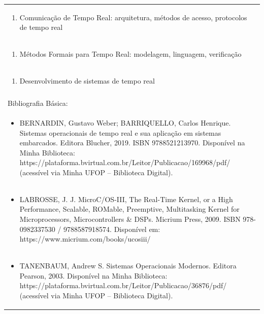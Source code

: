 \documentclass[11pt]{article}
\begin{document}
\begin{center}
\begin{longtable}{|p{4cm}|p{4cm}|p{4cm}|p{4cm}|}
\multicolumn{4}{|p{\dimexpr 16cm + 6\tabcolsep\relax}|}{\begin{enumerate}[start=8]\item Comunicação de Tempo Real: arquitetura, métodos de acesso, protocolos de tempo real\end{enumerate}}\\
\multicolumn{4}{|p{\dimexpr 16cm + 6\tabcolsep\relax}|}{\begin{enumerate}[start=9]\item Métodos Formais para Tempo Real: modelagem, linguagem, verificação\end{enumerate}}\\
\multicolumn{4}{|p{\dimexpr 16cm + 6\tabcolsep\relax}|}{\begin{enumerate}[start=10]\item Desenvolvimento de sistemas de tempo real\end{enumerate}}\\
\multicolumn{4}{|p{\dimexpr 16cm + 6\tabcolsep\relax}|}{}\\
\hline
\multicolumn{4}{|p{16cm}|}{Bibliografia Básica:}\\*
\multicolumn{4}{|p{\dimexpr 16cm + 6\tabcolsep\relax}|}{\begin{itemize}\item BERNARDIN, Gustavo Weber; BARRIQUELLO, Carlos Henrique. Sistemas operacionais de tempo real e sua aplicação em sistemas embarcados. Editora Blucher, 2019. ISBN 9788521213970. Disponível na Minha Biblioteca: https://plataforma.bvirtual.com.br/Leitor/Publicacao/169968/pdf/ (acessível via Minha UFOP – Biblioteca Digital).\end{itemize}}\\
\multicolumn{4}{|p{\dimexpr 16cm + 6\tabcolsep\relax}|}{\begin{itemize}\item LABROSSE, J. J. MicroC/OS-III, The Real-Time Kernel, or a High Performance, Scalable, ROMable, Preemptive, Multitasking Kernel for Microprocessors, Microcontrollers \& DSPs. Micrium Press, 2009. ISBN 978-0982337530 / 9788587918574. Disponível em: https://www.micrium.com/books/ucosiii/\end{itemize}}\\
\multicolumn{4}{|p{\dimexpr 16cm + 6\tabcolsep\relax}|}{\begin{itemize}\item TANENBAUM, Andrew S. Sistemas Operacionais Modernos. Editora Pearson, 2003. Disponível na Minha Biblioteca: https://plataforma.bvirtual.com.br/Leitor/Publicacao/36876/pdf/ (acessível via Minha UFOP – Biblioteca Digital).\end{itemize}}\\

\end{longtable}
\end{center}
\end{document}
